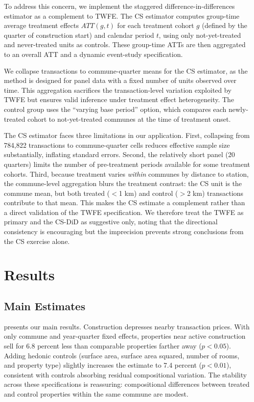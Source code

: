 \documentclass[12pt]{article}
\begin{document}
To address this concern, we implement the \citet{callaway2021difference} staggered difference-in-differences estimator as a complement to TWFE. The CS estimator computes group-time average treatment effects $ATT(g,t)$ for each treatment cohort $g$ (defined by the quarter of construction start) and calendar period $t$, using only not-yet-treated and never-treated units as controls. These group-time ATTs are then aggregated to an overall ATT and a dynamic event-study specification.

We collapse transactions to commune-quarter means for the CS estimator, as the method is designed for panel data with a fixed number of units observed over time. This aggregation sacrifices the transaction-level variation exploited by TWFE but ensures valid inference under treatment effect heterogeneity. The control group uses the ``varying base period'' option, which compares each newly-treated cohort to not-yet-treated communes at the time of treatment onset.

The CS estimator faces three limitations in our application. First, collapsing from 784,822 transactions to commune-quarter cells reduces effective sample size substantially, inflating standard errors. Second, the relatively short panel (20 quarters) limits the number of pre-treatment periods available for some treatment cohorts. Third, because treatment varies \textit{within} communes by distance to station, the commune-level aggregation blurs the treatment contrast: the CS unit is the commune mean, but both treated ($<$1 km) and control ($>$2 km) transactions contribute to that mean. This makes the CS estimate a complement rather than a direct validation of the TWFE specification. We therefore treat the TWFE as primary and the CS-DiD as suggestive only, noting that the directional consistency is encouraging but the imprecision prevents strong conclusions from the CS exercise alone.


\section{Results}
\label{sec:results}

\subsection{Main Estimates}

 presents our main results. Construction depresses nearby transaction prices. With only commune and year-quarter fixed effects, properties near active construction sell for 6.8 percent less than comparable properties farther away ($p < 0.05$). Adding hedonic controls (surface area, surface area squared, number of rooms, and property type) slightly increases the estimate to 7.4 percent ($p < 0.01$), consistent with controls absorbing residual compositional variation. The stability across these specifications is reassuring: compositional differences between treated and control properties within the same commune are modest.
\end{document}
